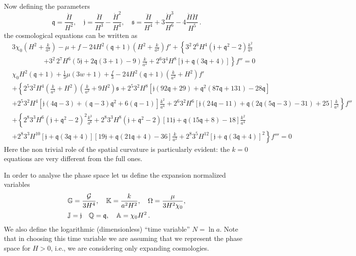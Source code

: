 \documentclass[a4paper,aps,onecolumn,nofootinbib]{revtex4}
\def\G{{\cal G}}
\begin{document}
Now defining the parameters
\begin{equation} \label{HubbleVarDS}
{\mathfrak q} =\frac{\dot{H}}{H^2},\quad {\mathfrak j} =\frac{\ddot{H}}{ H^3}-\frac{\dot{H}^2}{
   H^4},\quad{\mathfrak s}=\frac{\dddot{H}}{ H^4}+3\frac{\dot{H}^3}{ H^6}-4\frac{ \dot{H}
   \ddot{H}}{ H^5}\,.
\end{equation}
the cosmological equations can be written as
\begin{align}\label{CosmEqVar}
&\nonumber 3\chi_0\left(H^2+ \frac{k}{a^2}\right) - \mu +f -24 H^2 (\mathfrak{q}+1) \left( H^2+\frac{k}{a^2}\right) f'+\left\{3^2\,2^6  H^4 \left(\mathfrak{j}+\mathfrak{q}^2-2\right)\frac{k^2}{a^4} \right.\\
&~~~~~~~~~~~~~~~~~~~~~\left.+3^2\,2^7 H^6  \left(5 \mathfrak{j}+2 \mathfrak{q} (3+1)
-9\right)\frac{k}{a^2}+2^6 3^4 H^8 [\mathfrak{j}+\mathfrak{q} (3 \mathfrak{q}+4)]\right\} f''=0\\
&\nonumber \chi_0 H^2 (\mathfrak{q}+1)+\frac{1}{3} \mu  (3 w+1)+\frac{f}{3}-24 H^2 (\mathfrak{q}+1) \left(\frac{k}{a^2}+H^2\right) f'\\
& \nonumber +\left\{2^5 3^2  H^4  \left(\frac{k}{a^2}+H^2\right)
   \left(\frac{k}{a^2}+9 H^2\right)\mathfrak{s}+2^5 3^2  H^8 [\mathfrak{j} (92 \mathfrak{q}+29)+ \mathfrak{q}^2 (87 \mathfrak{q}+131)-28\mathfrak{q}]\right.\\
&\nonumber \left. +2^5 3^2 H^4 [\mathfrak{j} (4 \mathfrak{q}-3)+(\mathfrak{q}-3) \mathfrak{q}^2+6(\mathfrak{q}-1) ] \frac{k^2}{a^4}+2^6 3^2 H^6  [\mathfrak{j} (24
   \mathfrak{q}-11)+\mathfrak{q} (2 \mathfrak{q} (5 \mathfrak{q}-3)-31)+25]\frac{k}{a^2}\right\}f''\\
 &\nonumber  + \left\{2^8 3^3 H^6  \left(\mathfrak{j}+\mathfrak{q}^2-2\right)^2\frac{k^3}{a^6}+2^8 3^3 H^8 
   \left(\mathfrak{j}+\mathfrak{q}^2-2\right) [11 \mathfrak{j}+\mathfrak{q} (15 \mathfrak{q}+8)-18]\frac{k^2}{a^4}\right.\\
 &\left.  +2^8 3^3 H^{10} [\mathfrak{j}+\mathfrak{q} (3 \mathfrak{q}+4)] [19
   \mathfrak{j}+\mathfrak{q} (21 \mathfrak{q}+4)-36] \frac{k}{a^2}+2^8 3^5  H^{12} [\mathfrak{j}+\mathfrak{q} (3 \mathfrak{q}+4)]^2\right\}f'''=0
\end{align}
Here the non trivial role of the spatial curvature is particularly evident: the
$k=0$ equations are very different from the full ones.
 
In order to analyse the phase space let us define the expansion normalized variables 
\begin{align} \label{DynVar}
\begin{split}
&\mathbb{G}=\frac{\G}{3 H^4},\quad \mathbb{K}=\frac{k}{a^2 H^2},\quad \Omega =\frac{\mu }{3H^2 \chi_0},\\
& \mathbb{J}=\mathfrak j\quad \mathbb{Q}=\mathfrak q,\quad \mathbb{A}=\chi_0H^2\,.
\end{split}
\end{align}
We also  define the logarithmic (dimensionless) ``time variable'' $N=\ln a$. Note that in choosing this time variable we are assuming that we represent the phase space for $H>0$, i.e., we are considering only expanding cosmologies.
\end{document}

